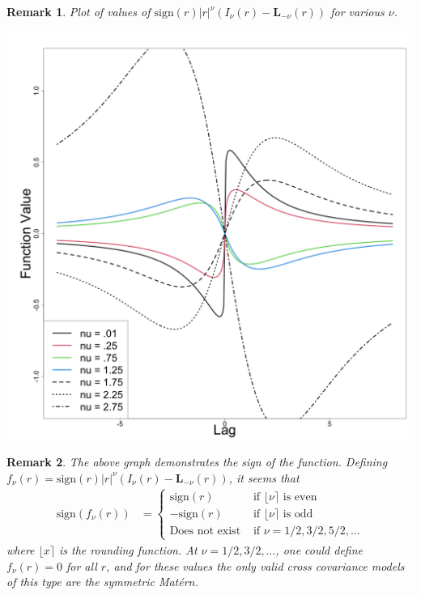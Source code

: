 \documentclass[11pt]{article}
\newtheorem*{remark}{Remark}
\begin{document}
\begin{remark}
Plot of values of $\textrm{sign}(r)|r|^\nu(I_\nu(r) - \boldsymbol{L}_{-\nu}(r))$ for various $\nu$.

\centering
\includegraphics[scale = .15]{../example_fun.png}

\end{remark}

\begin{remark}
The above graph demonstrates the sign of the function. Defining $f_\nu(r) = \textrm{sign}(r)|r|^\nu(I_\nu(r) - \boldsymbol{L}_{-\nu}(r))$, it seems that \begin{align*}
\textrm{sign}(f_\nu(r)) &= \begin{cases} \textrm{sign}(r) & \textrm{ if } \lfloor\nu \rceil \textrm{ is even} \\
-\textrm{sign}(r) & \textrm{ if }\lfloor\nu\rceil \textrm{ is odd} \\ 
\textrm{Does not exist} & \textrm{ if } \nu = 1/2, 3/2, 5/2, \dots \end{cases}
\end{align*}where $ \lfloor x \rceil$ is the rounding function. At $\nu = 1/2, 3/2, \dots$, one could define $f_\nu(r) = 0$ for all $r$, and for these values the only valid cross covariance models of this type are the symmetric Mat\'ern.
\end{remark}
\end{document}
